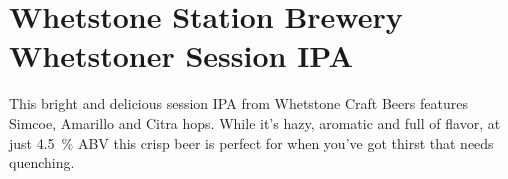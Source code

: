 \documentclass[10pt,oneside]{scrbook}
\begin{document}
\begin{ingredientsblock}

\begin{malts}
\end{malts}

\begin{hops}
\end{hops}

\end{ingredientsblock}

\pagebreak

\begin{ingredientsblock}

\begin{yeasts}
\end{yeasts}

\end{ingredientsblock}


\chapter*{Whetstone Station Brewery Whetstoner Session IPA}

\begin{aboutblock}
This bright and delicious session IPA from Whetstone Craft Beers features Simcoe,
Amarillo and Citra hops. While it's hazy, aromatic and full of flavor, at just 4.5~\% ABV
this crisp beer is perfect for when you've got thirst that needs quenching.
\end{aboutblock}
\end{document}
